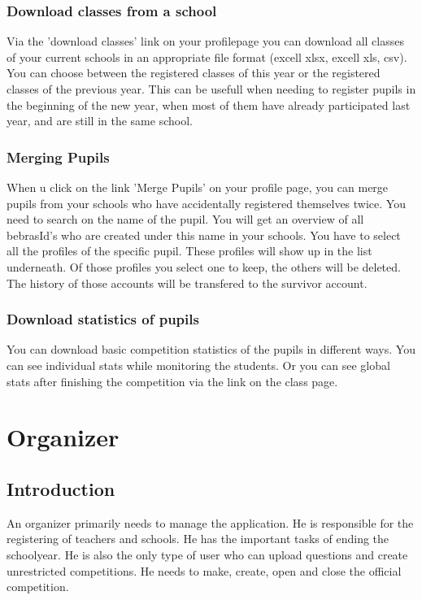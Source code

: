 \documentclass[11pt,a4paper]{report}
\begin{document}
\subsection{Download classes from a school}
Via the 'download classes' link on your profilepage you can download all classes of your current schools in an appropriate file format (excell xlsx, excell xls, csv). You can choose between the registered classes of this year or the registered classes of the previous year. This can be usefull when needing to register pupils in the beginning of the new year, when most of them have already participated last year, and are still in the same school.

\subsection{Merging Pupils}
When u click on the link 'Merge Pupils' on your profile page, you can merge pupils from your schools who have accidentally registered themselves twice. You need to search on the name of the pupil. You will get an overview of all bebrasId's who are created under this name in your schools. You have to select all the profiles of the specific pupil. These profiles will show up in the list underneath. Of those profiles you select one to keep, the others will be deleted. The history of those accounts will be transfered to the survivor account. 

\subsection{Download statistics of pupils}
You can download basic competition statistics of the pupils in different ways. You can see individual stats while monitoring the students. Or you can see global stats after finishing the competition via the link on the class page.


\chapter{Organizer}

\section{Introduction}
An organizer primarily needs to manage the application. He is responsible for the registering of teachers and schools. He has the important tasks of ending the schoolyear. He is also the only type of user who can upload questions and create unrestricted competitions. He needs to make, create, open and close the official competition.
\end{document}
